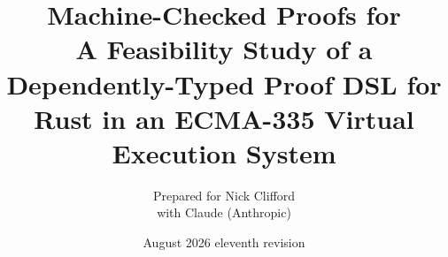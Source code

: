 \documentclass[11pt]{article}
\title{\sffamily\bfseries
  Machine-Checked \safetyc{} Proofs for \dotnetrs{}\\[0.4em]
  \large A Feasibility Study of a Dependently-Typed Proof DSL for
  \code{unsafe} Rust in an ECMA-335 Virtual Execution System}
\author{Prepared for Nick Clifford\\
  \small with Claude (Anthropic)}
\date{August 2026 \textperiodcentered{} eleventh revision}
\begin{document}
\maketitle

\begin{abstract}

\end{abstract}

\tableofcontents
\newpage













\printbibliography
\end{document}
